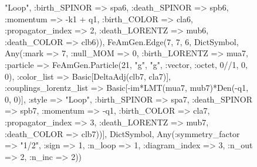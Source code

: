 \documentclass{revtex4}
\begin{document}
\begin{figure}[!htb]
\begin{center}
{"Loop", :birth_SPINOR => spa6, :death_SPINOR => spb6, :momentum => -k1 + q1, :birth_COLOR => cla6, :propagator_index => 2, :death_LORENTZ => mub6, :death_COLOR => clb6)), FeAmGen.Edge(7, 7, 6, Dict{Symbol, Any}(:mark => 7, :null_MOM => 0, :birth_LORENTZ => mua7, :particle => FeAmGen.Particle(21, "g", "g", :vector, :octet, 0//1, 0, 0), :color_list => Basic[DeltaAdj(clb7, cla7)], :couplings_lorentz_list => Basic[-im*LMT(mua7, mub7)*Den(-q1, 0, 0)], :style => "Loop", :birth_SPINOR => spa7, :death_SPINOR => spb7, :momentum => -q1, :birth_COLOR => cla7, :propagator_index => 3, :death_LORENTZ => mub7, :death_COLOR => clb7))], Dict{Symbol, Any}(:symmetry_factor => "1/2", :sign => 1, :n_loop => 1, :diagram_index => 3, :n_out => 2, :n_inc => 2)) 
}
\end{center}
\end{figure}
\end{document}
